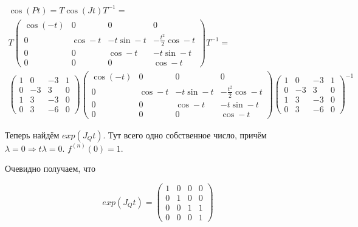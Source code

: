 \documentclass[12pt, a4paper]{article}
\begin{document}
    \begin{multline}
        \cos(Pt) = T \cos(Jt) T^{-1} =  \\
        T \left(\begin{matrix}
            \cos (-t) & 0 & 0 & 0 \\
            0 & \cos -t & -t \sin -t & -\frac{t^2}{2} \cos -t \\
            0 & 0 & \cos -t & -t \sin -t \\
            0 & 0 & 0 & \cos -t
        \end{matrix}\right) T^{-1} = \\
        \left(\begin{matrix}
            1 & 0 & -3 & 1 \\
            0 & -3 & 3 & 0 \\
            1 & 3 & -3 & 0 \\
            0 & 3 & -6 & 0
        \end{matrix}\right) \left(\begin{matrix}
            \cos (-t) & 0 & 0 & 0 \\
            0 & \cos -t & -t \sin -t & -\frac{t^2}{2} \cos -t \\
            0 & 0 & \cos -t & -t \sin -t \\
            0 & 0 & 0 & \cos -t
        \end{matrix}\right) \left(\begin{matrix}
            1 & 0 & -3 & 1 \\
            0 & -3 & 3 & 0 \\
            1 & 3 & -3 & 0 \\
            0 & 3 & -6 & 0
        \end{matrix}\right)^{-1}
    \end{multline}

    Теперь найдём $exp(J_Q t)$. Тут всего одно собственное число, причём $\lambda = 0 \Longrightarrow t\lambda = 0$.
    $f^{(n)}(0) = 1$.

    Очевидно получаем, что
    
    \begin{equation}
        exp(J_Q t) = \left(\begin{matrix}
            1 & 0 & 0 & 0 \\
            0 & 1 & 0 & 0 \\
            0 & 0 & 1 & 1 \\
            0 & 0 & 0 & 1
        \end{matrix}\right)
    \end{equation}
\end{document}
